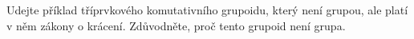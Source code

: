 \subsubsection{}
Udejte příklad tříprvkového komutativního grupoidu, který není grupou, ale platí
v něm zákony o krácení. Zdůvodněte, proč tento grupoid není grupa.
